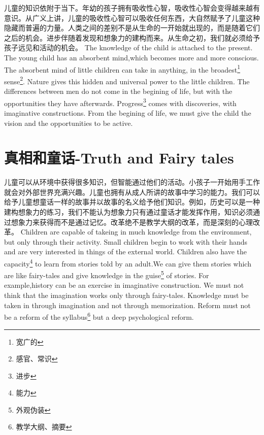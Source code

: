 \documentclass[lang=cn,10pt]{elegantbook}
\begin{document}
\begin{tcolorbox}[title=摘要,
colback=red!5!white,
colframe=red!75!black,
fonttitle=\bfseries]
儿童的知识依附于当下。年幼的孩子拥有吸收性心智，吸收性心智会变得越来越有意识。从广义上讲，儿童的吸收性心智可以吸收任何东西，大自然赋予了儿童这种隐藏而普遍的力量。人类之间的差别不是从生命的一开始就出现的，而是随着它们之后的机会。进步伴随着发现和想象力的建构而来。从生命之初，我们就必须给予孩子远见和活动的机会。
The knowledge of the child is attached to the present. The young child has an absorbent mind,which becomes more and more conscious. The absorbent mind of little children can take in anything, in the broadest\footnote{宽广的} sense\footnote{感官、常识}. Nature gives this hidden and universal power to the little children. The differences between men do not come in the begining of life, but with the opportunities they have afterwards. Progress\footnote{进步} comes with discoveries, with imaginative constructions. From the begining of life, we must give the child the vision and the opportunities to be active.
\end{tcolorbox}

\chapter{真相和童话-Truth and Fairy tales}

\begin{tcolorbox}[title=摘要,
colback=red!5!white,
colframe=red!75!black,
fonttitle=\bfseries]
儿童可以从环境中获得很多知识，但智能通过他们的活动。小孩子一开始用手工作就会对外部世界充满兴趣。儿童也拥有从成人所讲的故事中学习的能力。我们可以给予儿童想童话一样的故事并以故事的名义给予他们知识。例如，历史可以是一种建构想象力的练习，我们不能认为想象力只有通过童话才能发挥作用，知识必须通过想象力来获得而不是通过记忆。改革绝不是教学大纲的改革，而是深刻的心理改革。
Children are capable of takeing in much knowledge from the environment, but only through their activity. Small children begin to work with their hands and are very interested in things of the external world. Children also have the capacity\footnote{能力} to learn from stories told by an adult.We can give them stories which are like fairy-tales and give knowledge in the guise\footnote{外观伪装} of stories. For example,history can be an exercise in imaginative construction. We must not think that the imagination works only through fairy-tales. Knowledge must be taken in through imagination and not through memorization. Reform must not be a reform of the syllabus\footnote{教学大纲、摘要} but a deep psychological reform.
\end{tcolorbox}
\end{document}
